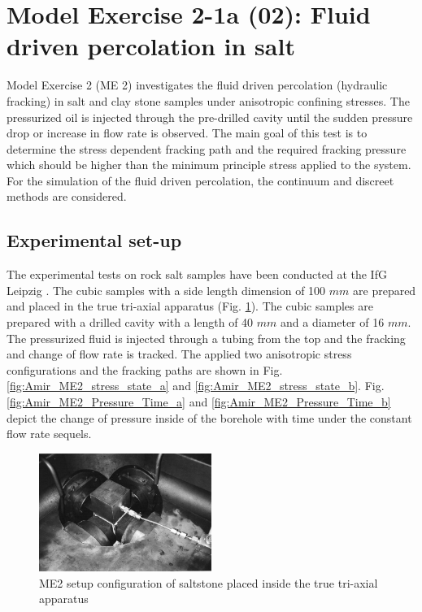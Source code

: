 \section{Model Exercise 2-1a (02): Fluid driven percolation in salt}
\label{sec:mex02}
Model Exercise 2 (ME 2) investigates the fluid driven percolation (hydraulic fracking) in salt and clay stone samples under anisotropic confining stresses. The pressurized oil is injected through the pre-drilled cavity until the sudden pressure drop or increase in flow rate is observed. The main goal of this test is to determine the stress dependent fracking path and the required fracking pressure which should be higher than the minimum principle stress applied to the system. For the simulation of the fluid driven percolation, the continuum and discreet methods are considered.
\subsection{Experimental set-up}
The experimental tests on rock salt samples have been conducted at the IfG Leipzig \cite{Kamlot2009}. The cubic samples with a side length dimension of 100 $mm$ are prepared and placed in the true tri-axial apparatus (Fig. \ref{fig:Amir_ME2_Saltstone_Setup}). The cubic samples are prepared with a drilled cavity with a length of 40 $mm$ and a diameter of 16 $mm$. The pressurized fluid is injected through a tubing from the top and the fracking and change of flow rate is tracked. The applied two anisotropic stress configurations and the fracking paths are shown in  Fig. \ref{fig:Amir_ME2_stress_state_a} and \ref{fig:Amir_ME2_stress_state_b}. Fig. \ref{fig:Amir_ME2_Pressure_Time_a} and \ref{fig:Amir_ME2_Pressure_Time_b} depict the change of pressure inside of the borehole with time under the constant flow rate sequels.

\begin{figure}[!ht]
\centering
\includegraphics[width=0.5\textwidth]{figures/Amir_ME2_Saltstone_Setup.png}
\caption{ME2 setup configuration of saltstone placed inside the true tri-axial apparatus \cite{Kamlot2009}}
\label{fig:Amir_ME2_Saltstone_Setup}
\end{figure}

